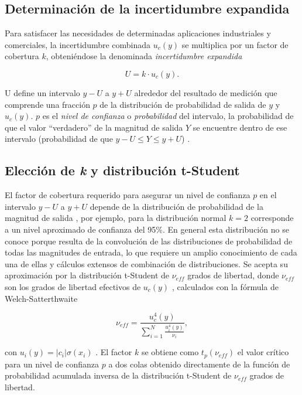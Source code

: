 \subsection{Determinación de la incertidumbre expandida}

Para satisfacer las necesidades de determinadas aplicaciones industriales y comerciales, la incertidumbre combinada $u_c(y)$ se multiplica por un factor de cobertura $k$, obteniéndose la denominada \textit{incertidumbre expandida}

\begin{equation}
    U = k \cdot u_c(y).
\end{equation}

U define un intervalo $y - U$ a $y + U$ alrededor del resultado de medición que comprende una fracción $p$ de la distribución de probabilidad de salida de $y$ y $u_c(y)$. $p$ es el \textit{nivel de confianza} o \textit{probabilidad} del intervalo, la probabilidad de que el valor ``verdadero'' de la magnitud de salida $Y$ se encuentre dentro de ese intervalo (probabilidad de que $y-U\leq Y \leq y+U$) \cite{GUM6.2}. 

\subsection{Elección de \textit{k} y distribución t-Student}

El factor de cobertura requerido para asegurar un nivel de confianza $p$ en el intervalo $y - U$ a $y + U$ depende de la distribución de probabilidad de la magnitud de salida \cite{GUM6.2}, por ejemplo, para la distribución normal $k=2$ corresponde a un nivel aproximado de confianza del 95\%. En general esta distribución no se conoce porque resulta de la convolución de las distribuciones de probabilidad de todas las magnitudes de entrada, lo que requiere un amplio conocimiento de cada una de ellas y cálculos extensos de combinación de distribuciones. Se acepta su aproximación por la distribución t-Student de $\nu_{eff}$ grados de libertad, donde $\nu_{eff}$ son los grados de libertad efectivos de $u_c(y)$ \cite{GUMG.6.2}, calculados con la fórmula de Welch-Satterthwaite


\begin{equation}
    \nu_{eff} = \frac{u_c^4(y)}{\sum^N_{i=1}\frac{u_i^4(y)}{\nu_i}},
\end{equation}

con $u_i(y) = |c_i|\sigma(x_i)$ \cite{GUMG.6.4}. El factor $k$ se obtiene como $t_p(\nu_{eff})$ el valor crítico para un nivel de confianza $p$ a dos colas obtenido directamente de la función de probabilidad acumulada inversa de la distribución t-Student de $\nu_{eff}$ grados de libertad. 

